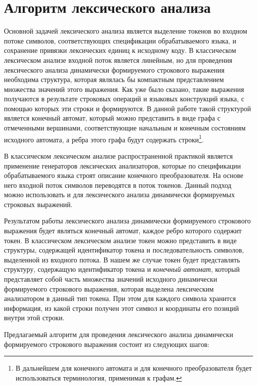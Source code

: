 \section{Алгоритм лексического анализа}

Основной задачей лексического анализа является выделение токенов во входном потоке символов, соответствующих спецификации обрабатываемого языка, и сохранение привязки лексических единиц к исходному коду. В классическом лексическом анализе входной поток является линейным, но для проведения лексического анализа динамически формируемого строкового выражения необходима структура, которая являлась бы компактным представлением множества значений этого выражения. Как уже было сказано, такие выражения получаются в результате строковых операций и языковых конструкций языка, с помощью которых эти строки и формируются. В данной работе такой структурой является конечный автомат, который можно представить в виде графа с отмеченными вершинами, соответствующие начальным и конечным состояниям исходного автомата, а ребра этого графа будут содержать строки\footnote{В дальнейшем для конечного автомата и для конечного преобразователя будет использоваться терминология, применимая к графам.}. 

В классическом лексическом анализе распространенной практикой является применение генераторов лексических анализаторов, которые по спецификации обрабатываемого языка строят описание конечного преобразователя. На основе него входной поток символов переводятся в поток токенов. Данный подход можно использовать и для лексического анализа динамически формируемых строковых выражений. 

Результатом работы лексического анализа динамически формируемого строкового выражения будет являться конечный автомат, каждое ребро которого содержит токен. В классическом лексическом анализе токен можно представить в виде структуры, содержащей идентификатор токена и последовательность символов, выделенной из входного потока. В нашем же случае токен будет представлять структуру, содержащую идентификатор токена  и \textit{конечный автомат}, который представляет собой часть множества значений исходного динамически формируемого строкового выражения, которая выделена лексическим анализатором в данный тип токена. При этом для каждого символа хранится информация, из какой строки получен этот символ и координаты его позиций внутри этой строки. 

Предлагаемый алгоритм для проведения лексического анализа динамически формируемого строкового выражения состоит из следующих шагов:

